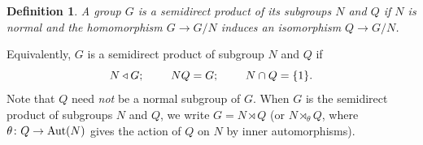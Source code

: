 \documentclass[a4paper,11pt,final,openany]{memoir}%
\newtheorem{definition}[X]{Definition}
\theoremstyle{nonumberplain}
\begin{document}
\begin{definition}
\label{it13} A group $G$ is a \emph{semidirect product\/}%
of its subgroups $N$ and $Q$ if $N$ is normal and the homomorphism
$G\rightarrow G/N$ induces an isomorphism $Q\rightarrow G/N$.
\end{definition}

Equivalently, $G$ is a semidirect product of subgroup $N$ and $Q$ if
\begin{equation}
N\triangleleft G\text{; \hspace{0.3in}}NQ=G\text{;\hspace{0.3in} }N\cap
Q=\{1\}. \label{e33}%
\end{equation}
Note that $Q$ need \textit{not\/} be a normal subgroup of $G$. When $G$ is the
semidirect product of subgroups $N$ and $Q$, we write $G=N\rtimes Q$ (or
$N\rtimes_{\theta}Q$, where $\theta\colon Q\rightarrow\operatorname{Aut}(N)$ gives the
action of $Q$ on $N$ by inner automorphisms).
\end{document}
